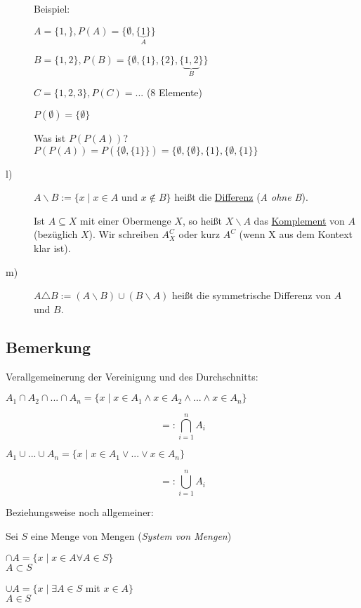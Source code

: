 \documentclass[a4paper, 12pt, twoside] {article}
\begin{document}
\begin{description}
	Beispiel:

	$A = \{1,\}, P(A) = \{\emptyset, \{ \underbrace{1}_{A}\}\}$

	$B = \{1, 2\}, P(B) = \{ \emptyset, \{1\}, \{2\}, \{ \underbrace{1, 2}_{B}\}\}$

	$C = \{1, 2, 3\}, P(C) = ...$ (8 Elemente)

	$P(\emptyset) = \{ \emptyset \}$

	Was ist $P (P(A))$? \\
	$P(P(A)) = P(\{ \emptyset, \{ 1 \}\}) = \{ \emptyset, \{ \emptyset \}, \{1 \}, \{ \emptyset, \{ 1 \}\}$ %

\item[l)]
	$A \backslash B := \{ x \mid x \in A$ und $x \notin B \}$ heißt die \underline{Differenz} (\textit{A ohne B}).

	Ist $A \subseteq X$ mit einer Obermenge $X$, so heißt $X \backslash A$ das \underline{Komplement} von $A$ (bezüglich $X$).
	Wir schreiben $A^C_X$ oder kurz $A^C$ (wenn X aus dem Kontext klar ist).


\item[m)]
	$A \triangle B := (A \backslash B) \cup (B \backslash A)$ heißt die symmetrische Differenz von $A$ und $B$. %


\end{description}

\subsection{Bemerkung}
Verallgemeinerung der Vereinigung und des Durchschnitts:

$A_1 \cap A_2 \cap ... \cap A_n = \{x \mid x \in A_1 \wedge x \in A_2 \wedge ... \wedge x \in A_n\}$

$$=: \bigcap_{i = 1}^{n} A_i$$

$A_1 \cup ... \cup A_n = \{x \mid x \in A_1 \lor  ... \lor x \in A_n\}$

$$=: \bigcup_{i = 1}^{n} A_i$$

Beziehungsweise noch allgemeiner:

Sei $S$ eine Menge von Mengen (\textit{System von Mengen})

$\cap A = \{ x \mid x \in A \forall A \in S\} $ \\
$ A \subset S$

$\cup A = \{ x \mid \exists A \in S$ mit $x \in A\} $ \\
$ A \in S$
\end{document}
